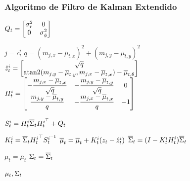 \begin{frame}
    \frametitle{Algoritmo de Filtro de Kalman Extendido}
    \footnotesize
     \begin{algorithmic}[1]
        \State
        $ Q_{t} =
            \begin{bmatrix}
                \sigma_{r}^{2} & 0\\
                0 & \sigma_{\phi}^{2}
            \end{bmatrix}
        $
        
        \State $ j = c_{t}^{i}$
        \State $ q = (m_{j,x}-\overline{\mu}_{t,x})^{2} + (m_{j,y}-\overline{\mu}_{t,y})^{2} $
        \State
        $ \hat{z}_{t}^{i} =
            \begin{bmatrix}
                \sqrt{q}\\
                \operatorname{atan2}(m_{j,y}-\overline{\mu}_{t,y}, m_{j,x}-\overline{\mu}_{t,x}) - \overline{\mu}_{t,\theta}
            \end{bmatrix}
        $
        \State
        $ H_{t}^{i} = 
            \begin{bmatrix}
                -\dfrac{m_{j,x} - \overline{\mu}_{t,x}}{\sqrt{q}} & -\dfrac{m_{j,y} - \overline{\mu}_{t,y}}{\sqrt{q}}  & 0\\
                \dfrac{m_{j,y} - \overline{\mu}_{t,y}}{q}  & -\dfrac{m_{j,x} - \overline{\mu}_{t,x}}{q}  & -1
            \end{bmatrix}
        $
        
        \State $S_{t}^{i} = H_{t}^{i} \overline{\Sigma}_{t} H_{t}^{i^{\top}} + Q_{t} $

        \State $K_{t}^{i} = \overline{\Sigma}_{t} {H_{t}^{i}}^{\top} S_{t}^{i^{-1}} $
        \State $\overline{\mu}_{t} = \overline{\mu}_{t} + K_{t}^{i}(z_{t} - \hat{z}_{t}^{i})$
        \State $\overline{\Sigma}_{t} = (I - K_{t}^{i}H_{t}^{i})\overline{\Sigma}_{t}$
        
        \EndFor
        \State $\mu_{t} = \overline{\mu}_{t}$
        \State $\Sigma_{t} = \overline{\Sigma}_{t}$
        
        \State \Return $\mu_{t}, \Sigma_{t}$
    \end{algorithmic}
    
    
\end{frame}

